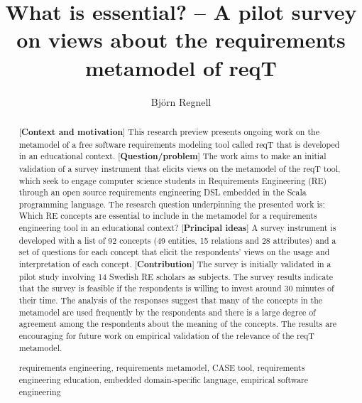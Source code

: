\documentclass[a4paper]{llncs}
\newcommand{\keywords}[1]{\par\addvspace\baselineskip
\noindent\keywordname\enspace\ignorespaces#1}
\begin{document}

\mainmatter  %

\title{What is essential? -- A pilot survey on views about the requirements metamodel of reqT}


\author{Bj\"orn Regnell}
%


\maketitle

\begin{abstract}
[{\bf Context and motivation}] This research preview presents ongoing work on the metamodel of a free software requirements modeling tool called reqT that is developed in an educational context. [{\bf Question/problem}] The work aims to make an initial validation of a survey instrument that elicits views on the metamodel of the reqT tool, which seek to engage computer science students in Requirements Engineering (RE) through an open source requirements engineering DSL embedded in the Scala programming language. The research question underpinning the presented work is: Which RE concepts are essential to include in the metamodel for a requirements engineering tool in an educational context?  [{\bf Principal ideas}] A survey instrument is developed with a list of 92 concepts (49 entities, 15 relations and 28 attributes) and a set of questions for each concept that elicit the respondents' views on the usage and interpretation of each concept.  [{\bf Contribution}] The survey is initially validated in a pilot study involving 14 Swedish RE scholars as subjects. The survey results indicate that the survey is feasible if the respondents is willing to invest around 30 minutes of their time. The analysis of the responses suggest that many of the concepts in the metamodel are used frequently by the respondents and there is a large degree of agreement among the respondents about the meaning of the concepts. The results are encouraging for future work on empirical validation of the relevance of the reqT metamodel. 

\keywords{requirements engineering, requirements metamodel, CASE tool, requirements engineering education, embedded domain-specific language, empirical software engineering}
\end{abstract}
\end{document}
